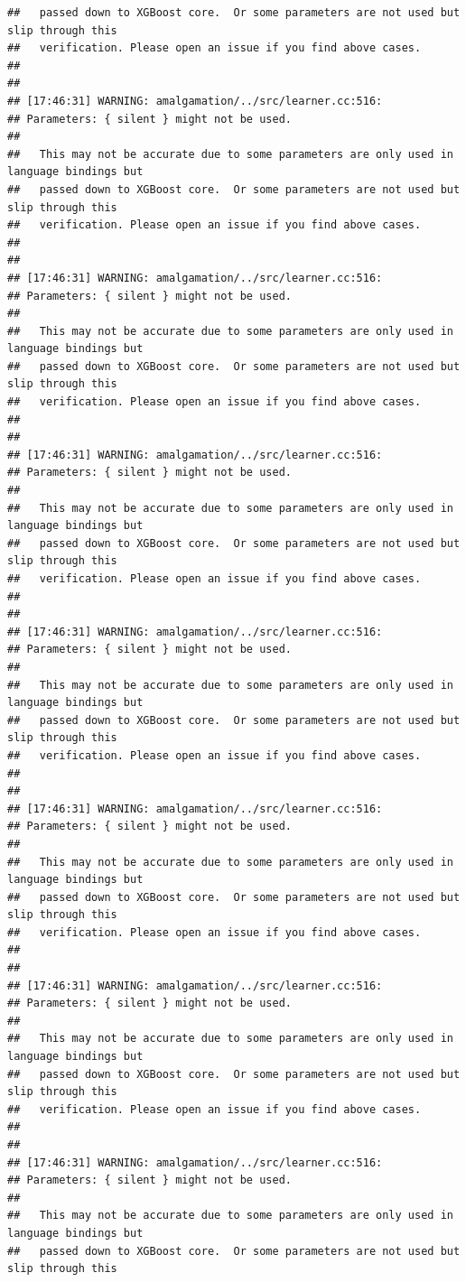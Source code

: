 \documentclass[AMS,STIX2COL]{WileyNJD-v2}\usepackage[]{graphicx}\usepackage[]{color}
\makeatletter
\newenvironment{kframe}{%
 \def\at@end@of@kframe{}%
 \ifinner\ifhmode%
  \def\at@end@of@kframe{\end{minipage}}%
  \begin{minipage}{\columnwidth}%
 \fi\fi%
 \def\FrameCommand##1{\hskip\@totalleftmargin \hskip-\fboxsep
 \colorbox{shadecolor}{##1}\hskip-\fboxsep
     \hskip-\linewidth \hskip-\@totalleftmargin \hskip\columnwidth}%
 \MakeFramed {\advance\hsize-\width
   \@totalleftmargin\z@ \linewidth\hsize
   \@setminipage}}%
 {\par\unskip\endMakeFramed%
 \at@end@of@kframe}
\newenvironment{knitrout}{}{} %
\makeatother
\begin{document}
\begin{knitrout}
\begin{kframe}
\begin{verbatim}
##   passed down to XGBoost core.  Or some parameters are not used but slip through this
##   verification. Please open an issue if you find above cases.
## 
## 
## [17:46:31] WARNING: amalgamation/../src/learner.cc:516: 
## Parameters: { silent } might not be used.
## 
##   This may not be accurate due to some parameters are only used in language bindings but
##   passed down to XGBoost core.  Or some parameters are not used but slip through this
##   verification. Please open an issue if you find above cases.
## 
## 
## [17:46:31] WARNING: amalgamation/../src/learner.cc:516: 
## Parameters: { silent } might not be used.
## 
##   This may not be accurate due to some parameters are only used in language bindings but
##   passed down to XGBoost core.  Or some parameters are not used but slip through this
##   verification. Please open an issue if you find above cases.
## 
## 
## [17:46:31] WARNING: amalgamation/../src/learner.cc:516: 
## Parameters: { silent } might not be used.
## 
##   This may not be accurate due to some parameters are only used in language bindings but
##   passed down to XGBoost core.  Or some parameters are not used but slip through this
##   verification. Please open an issue if you find above cases.
## 
## 
## [17:46:31] WARNING: amalgamation/../src/learner.cc:516: 
## Parameters: { silent } might not be used.
## 
##   This may not be accurate due to some parameters are only used in language bindings but
##   passed down to XGBoost core.  Or some parameters are not used but slip through this
##   verification. Please open an issue if you find above cases.
## 
## 
## [17:46:31] WARNING: amalgamation/../src/learner.cc:516: 
## Parameters: { silent } might not be used.
## 
##   This may not be accurate due to some parameters are only used in language bindings but
##   passed down to XGBoost core.  Or some parameters are not used but slip through this
##   verification. Please open an issue if you find above cases.
## 
## 
## [17:46:31] WARNING: amalgamation/../src/learner.cc:516: 
## Parameters: { silent } might not be used.
## 
##   This may not be accurate due to some parameters are only used in language bindings but
##   passed down to XGBoost core.  Or some parameters are not used but slip through this
##   verification. Please open an issue if you find above cases.
## 
## 
## [17:46:31] WARNING: amalgamation/../src/learner.cc:516: 
## Parameters: { silent } might not be used.
## 
##   This may not be accurate due to some parameters are only used in language bindings but
##   passed down to XGBoost core.  Or some parameters are not used but slip through this

\end{verbatim}
\end{kframe}
\end{knitrout}
\end{document}
